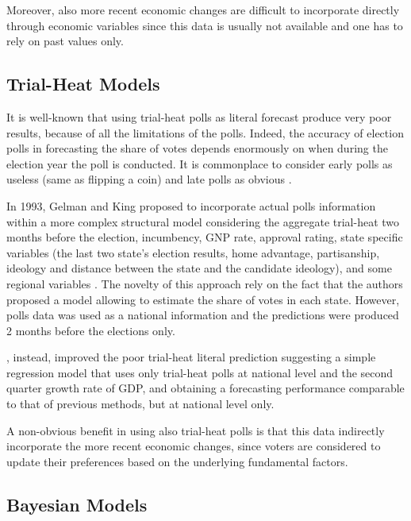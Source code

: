 \documentclass[
  12pt]{article}
\begin{document}
Moreover, also more recent economic changes are difficult to incorporate
directly through economic variables since this data is usually not
available and one has to rely on past values only.

\hypertarget{trial-heat-models}{%
\subsection{Trial-Heat Models}\label{trial-heat-models}}

It is well-known that using trial-heat polls as literal forecast produce
very poor results, because of all the limitations of the polls. Indeed,
the accuracy of election polls in forecasting the share of votes depends
enormously on when during the election year the poll is conducted. It is
commonplace to consider early polls as useless (same as flipping a coin)
and late polls as obvious \citep{cam:1996}.

In 1993, Gelman and King proposed to incorporate actual polls
information within a more complex structural model considering the
aggregate trial-heat two months before the election, incumbency, GNP
rate, approval rating, state specific variables (the last two state's
election results, home advantage, partisanship, ideology and distance
between the state and the candidate ideology), and some regional
variables \citep{gel:kin:1993}. The novelty of this approach rely on the
fact that the authors proposed a model allowing to estimate the share of
votes in each state. However, polls data was used as a national
information and the predictions were produced 2 months before the
elections only.

\citet{cam:1996}, instead, improved the poor trial-heat literal
prediction suggesting a simple regression model that uses only
trial-heat polls at national level and the second quarter growth rate of
GDP, and obtaining a forecasting performance comparable to that of
previous methods, but at national level only.

A non-obvious benefit in using also trial-heat polls is that this data
indirectly incorporate the more recent economic changes, since voters
are considered to update their preferences based on the underlying
fundamental factors.

\hypertarget{bayesian-models}{%
\subsection{Bayesian Models}\label{bayesian-models}}
\end{document}
